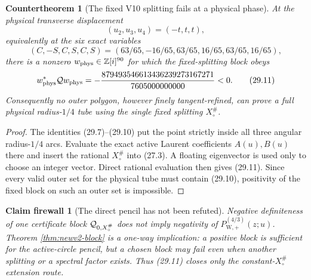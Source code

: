 \documentclass[11pt,oneside]{article}
\newtheorem{firewall}[theorem]{Claim firewall}
\newtheorem{countertheorem}[theorem]{Countertheorem}
\theoremstyle{definition}
\theoremstyle{remark}
\begin{document}
\begin{countertheorem}[The fixed V10 splitting fails at a physical phase]
\label{ctr:newv29-physical}
At the physical transverse displacement
\[
 (u_2,u_3,u_4)=(-t,t,t),                                \tag{29.9}
\]
equivalently at the six exact variables
\[
 (C,-S,C,S,C,S)
 =(63/65,-16/65,63/65,16/65,63/65,16/65),              \tag{29.10}
\]
there is a nonzero \(w_{\rm phys}\in\mathbb Z[i]^{90}\)
for which the fixed-splitting block obeys
\[
 w_{\rm phys}^*{\cal Q}w_{\rm phys}
 =-\frac{879493546613436239273167271}
 {7605000000000}<0.                                     \tag{29.11}
\]
Consequently no outer polygon, however finely tangent-refined, can
prove a full physical radius-\(1/4\) tube using the single fixed
splitting \(X_\circ^\#\).
\end{countertheorem}

\begin{proof}
The identities (29.7)--(29.10) put the point strictly inside all
three angular radius-\(1/4\) arcs.  Evaluate the exact active Laurent
coefficients \(A(u),B(u)\) there and insert the rational
\(X_\circ^\#\) into (27.3).  A floating eigenvector is used only to
choose an integer vector.  Direct rational evaluation then gives
(29.11).  Since every valid outer set for the physical tube must
contain (29.10), positivity of the fixed block on such an outer set
is impossible.
\end{proof}

\begin{firewall}[The direct pencil has not been refuted]
\label{fire:newv29-block-only}
Negative definiteness of one certificate block
\({\cal Q}_{0,X_\circ^\#}\) does not imply negativity of
\(P_{\mathrm W,+}^{(4/3)}(z;u)\).  Theorem
\ref{thm:newv2-block} is a one-way implication: a positive block is
sufficient for the active-circle pencil, but a chosen block may fail
even when another splitting or a spectral factor exists.  Thus
(29.11) closes only the constant-\(X_\circ^\#\) extension route.
\end{firewall}
\end{document}

